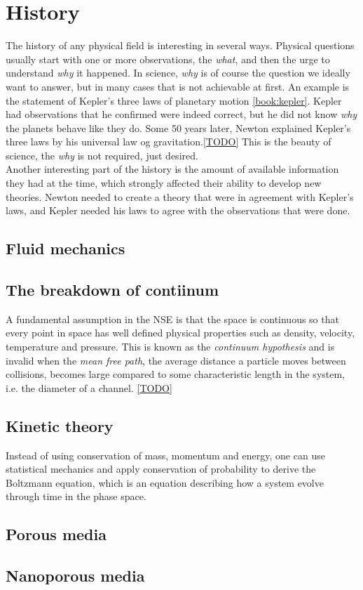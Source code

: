\section{History}
The history of any physical field is interesting in several ways. Physical questions usually start with one or more observations, the \textit{what}, and then the urge to understand \textit{why} it happened. In science, \textit{why} is of course the question we ideally want to answer, but in many cases that is not achievable at first. An example is the statement of Kepler's three laws of planetary motion \ref{book:kepler}. Kepler had observations that he confirmed were indeed correct, but he did not know \textit{why} the planets behave like they do. Some 50 years later, Newton explained Kepler's three laws by his universal law og gravitation.\ref{TODO} This is the beauty of science, the \textit{why} is not required, just desired.\\
Another interesting part of the history is the amount of available information they had at the time, which strongly affected their ability to develop new theories. Newton needed to create a theory that were in agreement with Kepler's laws, and Kepler needed his laws to agree with the observations that were done. 

\subsection{Fluid mechanics}


\subsection{The breakdown of contiinum}
A fundamental assumption in the NSE is that the space is continuous so that every point in space has well defined physical properties such as density, velocity, temperature and pressure. This is known as the \textit{continuum hypothesis} and is invalid when the \textit{mean free path}, the average distance a particle moves between collisions, becomes large compared to some characteristic length in the system, i.e. the diameter of a channel. \ref{TODO} 
\subsection{Kinetic theory}
Instead of using conservation of mass, momentum and energy, one can use statistical mechanics and apply conservation of probability to derive the Boltzmann equation, which is an equation describing how a system evolve through time in the phase space. 
\subsection{Porous media}
\subsection{Nanoporous media}